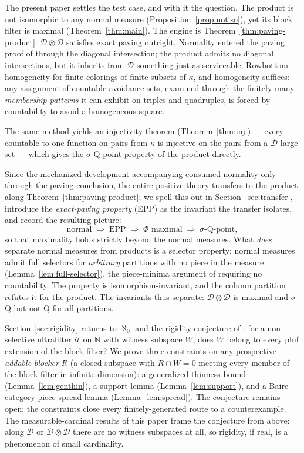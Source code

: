 \documentclass[11pt]{article}
\theoremstyle{definition}
\newcommand{\N}{\mathbb{N}}
\newcommand{\U}{\mathcal{U}}
\newcommand{\D}{\mathcal{D}}
\begin{document}
The present paper settles the test case, and with it the question. The
product is not isomorphic to any normal measure
(Proposition~\ref{prop:notiso}), yet its block filter is maximal
(Theorem~\ref{thm:main}). The engine is Theorem~\ref{thm:paving-product}:
$\D\otimes\D$ satisfies exact paving outright. Normality entered the paving
proof of \cite{FWIII} through the diagonal intersection; the product admits
no diagonal intersections, but it inherits from $\D$ something just as
serviceable, Rowbottom homogeneity for finite colorings of finite subsets of
$\kappa$, and homogeneity suffices: any assignment of countable
avoidance-sets, examined through the finitely many \emph{membership
patterns} it can exhibit on triples and quadruples, is forced by
countability to avoid a homogeneous square.

The same method yields an injectivity theorem
(Theorem~\ref{thm:inj}) --- every countable-to-one function on pairs from
$\kappa$ is injective on the pairs from a $\D$-large set --- which gives the
$\sigma$-Q-point property of the product directly.

Since the mechanized development accompanying \cite{FWIII} consumed
normality only through the paving conclusion, the entire positive theory
transfers to the product along Theorem~\ref{thm:paving-product}; we spell
this out in Section~\ref{sec:transfer}, introduce the \emph{exact-paving
property} (EPP) as the invariant the transfer isolates, and record the
resulting picture:
\[
\text{normal}\;\Longrightarrow\;\text{EPP}\;\Longrightarrow\;
\text{$\Phi$ maximal}\;\Longrightarrow\;\text{$\sigma$-Q-point},
\]
so that maximality holds strictly beyond the normal measures. What
\emph{does} separate normal measures from products is a selector property:
normal measures admit full selectors for \emph{arbitrary} partitions with no
piece in the measure (Lemma~\ref{lem:full-selector}), the piece-minima
argument of \cite{FWIII} requiring no countability. The property is
isomorphism-invariant, and the column partition refutes it for the product.
The invariants thus separate: $\D\otimes\D$ is maximal and $\sigma$-Q but
not Q-for-all-partitions.

Section~\ref{sec:rigidity} returns to $\aleph_0$ and the rigidity
conjecture of \cite{FWII}: for a non-selective ultrafilter $\U$ on $\N$
with witness subspace $W$, does $W$ belong to every pluf extension of the
block filter? We prove three constraints on any prospective \emph{addable
blocker} $R$ (a closed subspace with $R\cap W=0$ meeting every member of
the block filter in infinite dimension): a generalized thinness bound
(Lemma~\ref{lem:genthin}), a support lemma
(Lemma~\ref{lem:support}), and a Baire-category piece-spread lemma
(Lemma~\ref{lem:spread}). The conjecture remains open; the constraints
close every finitely-generated route to a counterexample. The measurable-cardinal results of this paper
frame the conjecture from above: along $\D$ or $\D\otimes\D$ there are no
witness subspaces at all, so rigidity, if real, is a phenomenon of small
cardinality.
\end{document}
